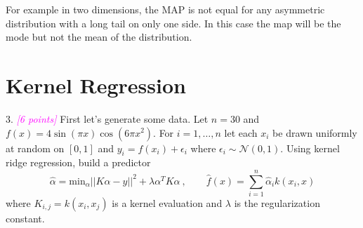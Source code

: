 \documentclass{article}
\newcommand{\1}{\mathbf{1}}
\newcommand{\grade}[1]{\small\textcolor{magenta}{\emph{[#1 points]}} \normalsize}
\begin{document}
For example in two dimensions, the MAP is not equal for any asymmetric distribution with a long tail on only one side. In this case the map will be the mode but not the mean of the distribution. 



\newpage 












\section{Kernel Regression}

3. \grade{6} First let's generate some data. Let $n=30$ and $f(x) = 4 \sin(\pi x)\cos(6\pi x^2)$. For $i=1,\dots,n$ let each $x_i$ be drawn uniformly at random on $[0,1]$ and $y_i = f(x_i) + \epsilon_i$ where $\epsilon_i \sim \mathcal{N}(0,1)$.
Using kernel ridge regression, build a predictor
\[
  \widehat{\alpha} = \mbox{min}_\alpha ||K\alpha - y||^2 + \lambda \alpha^T K \alpha \ , \quad \quad \widehat{f}(x)=\sum_{i=1}^n \widehat{\alpha}_i k(x_i,x) 
\]
where $K_{i,j} = k(x_i,x_j)$ is a kernel evaluation and $\lambda$ is the regularization constant. 
\end{document}
